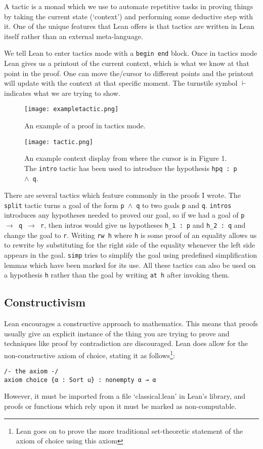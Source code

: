 \documentclass{article}
\newcommand{\ct}{\texttt}
\begin{document}
A tactic is a monad which we use to automate repetitive tasks in proving things by taking the current state (`context') and performing some deductive step with it.
One of the unique features that Lean offers is that tactics are written in Lean itself rather than an external meta-language.

We tell Lean to enter tactics mode with a \ct{begin end} block.
Once in tactics mode Lean gives us a printout of the current context, which is what we know at that point in the proof. 
One can move the/cursor to different points and the printout will update with the context at that specific moment.
The turnstile symbol $\vdash$ indicates what we are trying to show.


\begin{figure}
    \center
    \texttt{[image: exampletactic.png]}
    \caption{An example of a proof in tactics mode.}
    \center
    \texttt{[image: tactic.png]}
    \caption{An example context display from where the cursor is in Figure 1. The \ct{intro} tactic has been used to introduce the hypothesis \ct{hpq : p $\land$ q}.}
\end{figure}

There are several tactics which feature commonly in the proofs I wrote.
The \ct{split} tactic turns a goal of the form \ct{p $\land$ q} to two goals \ct{p} and \ct{q}.
\ct{intros} introduces any hypotheses needed to proved our goal, so if we had a goal of \ct{p $\to$ q $\to$ r}, then intros would give us hypotheses \ct{h\_1 :  p} and \ct{h\_2 : q} and change the goal to \ct{r}.
Writing \ct{rw h} where \ct{h} is some proof of an equality allows us to rewrite by substituting for the right side of the equality whenever the left side appears in the goal.
\ct{simp} tries to simplify the goal using predefined simplification lemmas which have been marked for its use.
All these tactics can also be used on a hypothesis \ct{h} rather than the goal by writing \ct{at h} after invoking them.

\FloatBarrier
\subsection{Constructivism}
Lean encourages a constructive approach to mathematics. 
This means that proofs usually give an explicit instance of the thing you are trying to prove and techniques like proof by contradiction are discouraged.
Lean does allow for the non-constructive axiom of choice, stating it as follows\footnote{Lean goes on to prove the more traditional set-theoretic statement of the axiom of choice using this axiom}: 
\begin{lstlisting}
/- the axiom -/
axiom choice {α : Sort u} : nonempty α → α
\end{lstlisting}
However, it must be imported from a file `classical.lean' in Lean's library, and proofs or functions which rely upon it must be marked as non-computable.
\end{document}
